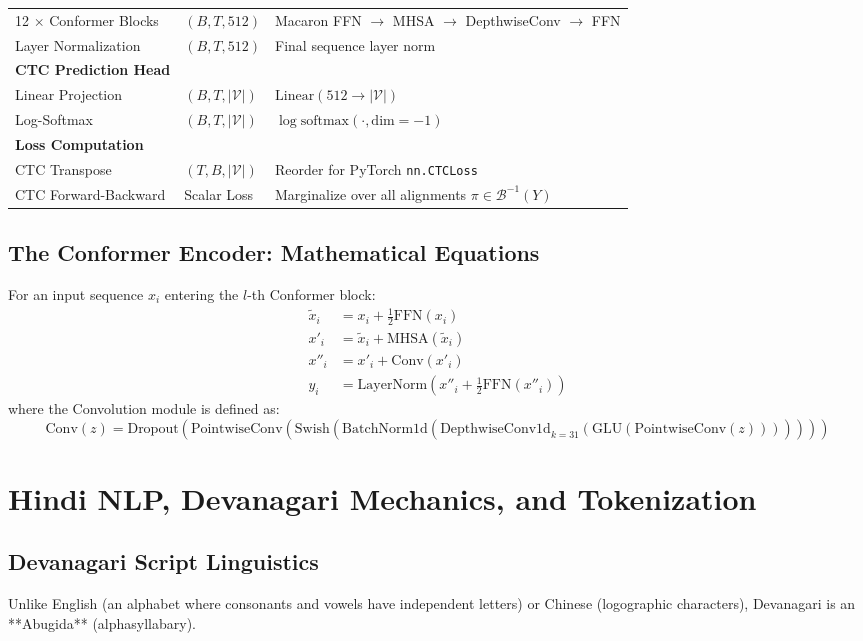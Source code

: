 \documentclass[11pt,a4paper]{report}
\begin{document}
\begin{longtable}{lll}
12 $\times$ Conformer Blocks & $(B, T, 512)$ & Macaron FFN $\to$ MHSA $\to$ DepthwiseConv $\to$ FFN \\
Layer Normalization & $(B, T, 512)$ & Final sequence layer norm \\
\midrule
\textbf{CTC Prediction Head} & & \\
Linear Projection & $(B, T, |\mathcal{V}|)$ & $\text{Linear}(512 \to |\mathcal{V}|)$ \\
Log-Softmax & $(B, T, |\mathcal{V}|)$ & $\log \text{softmax}(\cdot, \text{dim}=-1)$ \\
\midrule
\textbf{Loss Computation} & & \\
CTC Transpose & $(T, B, |\mathcal{V}|)$ & Reorder for PyTorch \texttt{nn.CTCLoss} \\
CTC Forward-Backward & Scalar Loss & Marginalize over all alignments $\pi \in \mathcal{B}^{-1}(Y)$ \\
\bottomrule
\end{longtable}

\section{The Conformer Encoder: Mathematical Equations}
For an input sequence $x_i$ entering the $l$-th Conformer block:
\begin{align}
    \tilde{x}_i &= x_i + \frac{1}{2} \text{FFN}(x_i) \\
    x'_i &= \tilde{x}_i + \text{MHSA}(\tilde{x}_i) \\
    x''_i &= x'_i + \text{Conv}(x'_i) \\
    y_i &= \text{LayerNorm}\left(x''_i + \frac{1}{2} \text{FFN}(x''_i)\right)
\end{align}
where the Convolution module is defined as:
\begin{equation}
    \text{Conv}(z) = \text{Dropout}\left(\text{PointwiseConv}\left(\text{Swish}\left(\text{BatchNorm1d}\left(\text{DepthwiseConv1d}_{k=31}\left(\text{GLU}\left(\text{PointwiseConv}(z)\right)\right)\right)\right)\right)\right)
\end{equation}

\chapter{Hindi NLP, Devanagari Mechanics, and Tokenization}

\section{Devanagari Script Linguistics}
Unlike English (an alphabet where consonants and vowels have independent letters) or Chinese (logographic characters), Devanagari is an **Abugida** (alphasyllabary).
\end{document}
